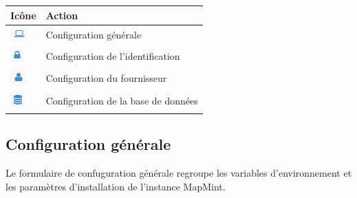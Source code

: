\documentclass[letterpaper,10pt,french]{sphinxmanual}
\begin{document}
\begin{tabulary}{\linewidth}{|L|L|}
\hline

\textbf{Icône}
 & 
\textbf{Action}
\\
\hline
\includegraphics{monitor.png}
 & 
Configuration générale
\\
\hline
\includegraphics{security.png}
 & 
Configuration de l'identification
\\
\hline
\includegraphics{user.png}
 & 
Configuration du fournisseur
\\
\hline
\includegraphics{db.png}
 & 
Configuration de la base de données
\\
\hline\end{tabulary}



\subsection{Configuration générale}
\label{dashboard/configuration:configuration-generale}
Le formulaire de confuguration générale regroupe les variables d'environnement et les paramètres d'installation de l'instance MapMint.
\end{document}
